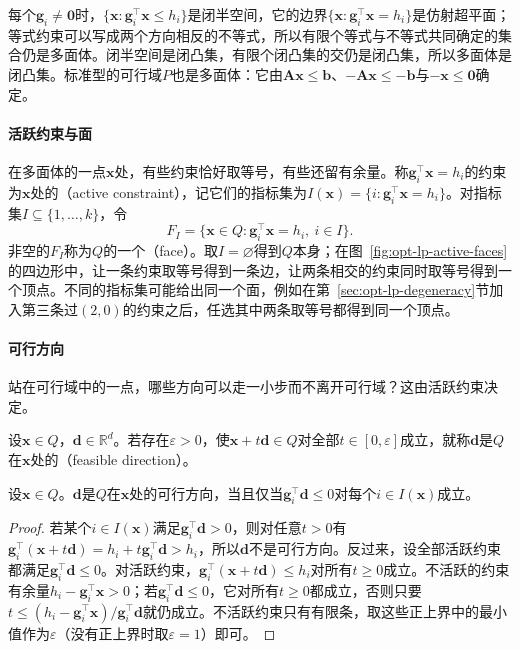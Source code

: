 每个$\bm g_i\ne\bm 0$时，$\{\bm x:\bm g_i^\top\bm x\le h_i\}$是闭半空间，它的边界$\{\bm x:\bm g_i^\top\bm x=h_i\}$是仿射超平面；等式约束可以写成两个方向相反的不等式，所以有限个等式与不等式共同确定的集合仍是多面体。闭半空间是闭凸集，有限个闭凸集的交仍是闭凸集，所以多面体是闭凸集。标准型的可行域$P$也是多面体：它由$\bm A\bm x\le\bm b$、$-\bm A\bm x\le-\bm b$与$-\bm x\le\bm 0$确定。

\paragraph{活跃约束与面}
在多面体的一点$\bm x$处，有些约束恰好取等号，有些还留有余量。称$\bm g_i^\top\bm x=h_i$的约束为$\bm x$处的（active constraint），记它们的指标集为$I(\bm x)=\{i:\bm g_i^\top\bm x=h_i\}$。对指标集$I\subseteq\{1,\dots,k\}$，令
\[
  F_I=\{\bm x\in Q:\bm g_i^\top\bm x=h_i,\ i\in I\}.
\]
非空的$F_I$称为$Q$的一个（face）。取$I=\varnothing$得到$Q$本身；在图~\ref{fig:opt-lp-active-faces}的四边形中，让一条约束取等号得到一条边，让两条相交的约束同时取等号得到一个顶点。不同的指标集可能给出同一个面，例如在第~\ref{sec:opt-lp-degeneracy}节加入第三条过$(2,0)$的约束之后，任选其中两条取等号都得到同一个顶点。

\paragraph{可行方向}
站在可行域中的一点，哪些方向可以走一小步而不离开可行域？这由活跃约束决定。

\begin{definition}[可行方向]
\label{def:opt-lp-feasible-direction}
设$\bm x\in Q$，$\bm d\in\mathbb R^d$。若存在$\varepsilon>0$，使$\bm x+t\bm d\in Q$对全部$t\in[0,\varepsilon]$成立，就称$\bm d$是$Q$在$\bm x$处的（feasible direction）。
\end{definition}

\begin{lemma}[多面体的可行方向]
\label{lem:opt-lp-feasible-direction}
设$\bm x\in Q$。$\bm d$是$Q$在$\bm x$处的可行方向，当且仅当$\bm g_i^\top\bm d\le0$对每个$i\in I(\bm x)$成立。
\end{lemma}

\begin{proof}
若某个$i\in I(\bm x)$满足$\bm g_i^\top\bm d>0$，则对任意$t>0$有$\bm g_i^\top(\bm x+t\bm d)=h_i+t\bm g_i^\top\bm d>h_i$，所以$\bm d$不是可行方向。反过来，设全部活跃约束都满足$\bm g_i^\top\bm d\le0$。对活跃约束，$\bm g_i^\top(\bm x+t\bm d)\le h_i$对所有$t\ge0$成立。不活跃的约束有余量$h_i-\bm g_i^\top\bm x>0$；若$\bm g_i^\top\bm d\le0$，它对所有$t\ge0$都成立，否则只要$t\le(h_i-\bm g_i^\top\bm x)/\bm g_i^\top\bm d$就仍成立。不活跃约束只有有限条，取这些正上界中的最小值作为$\varepsilon$（没有正上界时取$\varepsilon=1$）即可。
\end{proof}

